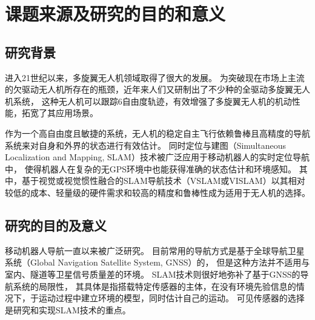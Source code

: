 \section{课题来源及研究的目的和意义}
\subsection{研究背景}
进入21世纪以来，多旋翼无人机领域取得了很大的发展。
为突破现在市场上主流的欠驱动无人机所存在的瓶颈，近年来人们又研制出了不少种的全驱动多旋翼无人机系统，
这种无人机可以跟踪6自由度轨迹，有效增强了多旋翼无人机的机动性能，拓宽了其应用场景。

作为一个高自由度且敏捷的系统，无人机的稳定自主飞行依赖鲁棒且高精度的导航系统来对自身和外界的状态进行有效估计。
同时定位与建图（Simultaneous Localization and Mapping, SLAM）技术\cite{liu2016asurvey}被广泛应用于移动机器人的实时定位导航中，
使得机器人在复杂的无GPS环境中也能获得准确的状态估计和环境感知。
其中，基于视觉或视觉惯性融合的SLAM导航技术（VSLAM或VISLAM）以其相对较低的成本、轻量级的硬件需求和较高的精度和鲁棒性成为适用于无人机的选择。

\subsection{研究的目的及意义}
移动机器人导航一直以来被广泛研究。
目前常用的导航方式是基于全球导航卫星系统（Global Navigation Satellite System, GNSS）的，
但是这种方法并不适用与室内、隧道等卫星信号质量差的环境。
SLAM技术则很好地弥补了基于GNSS的导航系统的局限性，
其具体是指搭载特定传感器的主体，在没有环境先验信息的情况下，于运动过程中建立环境的模型，同时估计自己的运动\cite{davison2007monoslam}。
可见传感器的选择是研究和实现SLAM技术的重点。

